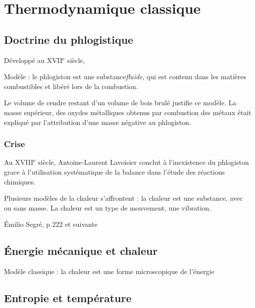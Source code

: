 

\section{Thermodynamique classique}

 \subsection{Doctrine du phlogistique}

Développé au {\footnotesize XVII}$^\text{e}$ siècle, 


Modèle : le phlogiston est une substance{\it fluide}, qui est contenu dans les matières combustibles et libéré lors de la combustion.

Le volume de cendre restant d'un volume de bois brulé justifie ce modèle. La masse supérieur, des oxydes métalliques obtenus par combustion des métaux était expliqué par l'attribution d'une masse négative au phlogiston.

 \subsubsection{Crise}

Au {\footnotesize XVIII}$^\text{e}$ siècle, Antoine-Laurent Lavoisier conclut à l'inexistence du phlogiston grace à l'utilisation systématique de la balance dans l'étude des réactions chimiques.

Plusieurs modèles de la chaleur s'affrontent : la chaleur est une substance, avec ou sans masse. La chaleur est un type de mouvement, une vibration.

{\sf Émilio Segré, p 222 et suivante}

 \subsection{Énergie mécanique et chaleur}

Modèle classique : la chaleur est une forme microscopique de l'énergie

 \subsection{Entropie et température}






